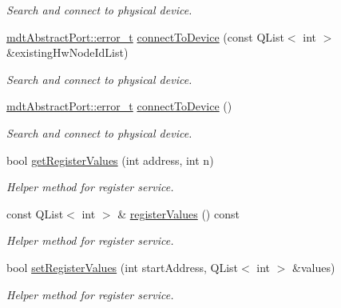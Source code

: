 \begin{DoxyCompactItemize}
\begin{DoxyCompactList}\small\item\em Search and connect to physical device. \end{DoxyCompactList}\item 
\hyperlink{classmdt_abstract_port_ad4121bb930c95887e77f8bafa065a85e}{mdtAbstractPort::error\_\-t} \hyperlink{classmdt_device_modbus_a08100215b37c0922ed177d1f99d07e97}{connectToDevice} (const QList$<$ int $>$ \&existingHwNodeIdList)
\begin{DoxyCompactList}\small\item\em Search and connect to physical device. \end{DoxyCompactList}\item 
\hyperlink{classmdt_abstract_port_ad4121bb930c95887e77f8bafa065a85e}{mdtAbstractPort::error\_\-t} \hyperlink{classmdt_device_modbus_abfcab17fbf05aab7843ae689316dd01f}{connectToDevice} ()
\begin{DoxyCompactList}\small\item\em Search and connect to physical device. \end{DoxyCompactList}\item 
bool \hyperlink{classmdt_device_modbus_a89d41c6b33a3dd2a92a0956d8e6b3b14}{getRegisterValues} (int address, int n)
\begin{DoxyCompactList}\small\item\em Helper method for register service. \end{DoxyCompactList}\item 
const QList$<$ int $>$ \& \hyperlink{classmdt_device_modbus_a83cb2a28111653fbcbbe748f7a1a2e3d}{registerValues} () const 
\begin{DoxyCompactList}\small\item\em Helper method for register service. \end{DoxyCompactList}\item 
bool \hyperlink{classmdt_device_modbus_a4128420bde679c3666bdf8954a221a53}{setRegisterValues} (int startAddress, QList$<$ int $>$ \&values)
\begin{DoxyCompactList}\small\item\em Helper method for register service. \end{DoxyCompactList}\end{DoxyCompactItemize}
